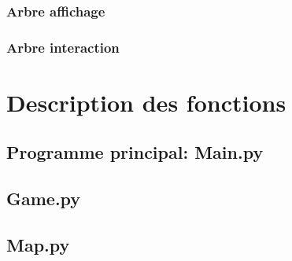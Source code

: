 \documentclass[a4paper]{article}
\begin{document}
            \subsubsection{Arbre affichage}
            \begin{alltt}
            
            \end{alltt}
            \subsubsection{Arbre interaction}
            \begin{alltt}
            
            \end{alltt}
    \section{Description des fonctions}
        \subsection{Programme principal: Main.py}
            \begin{alltt}
            
               
            \end{alltt}

        \subsection{Game.py}
            \begin{alltt}
                
            \end{alltt}

        \subsection{Map.py}
            \begin{alltt}
                 
            \end{alltt}
\end{document}
